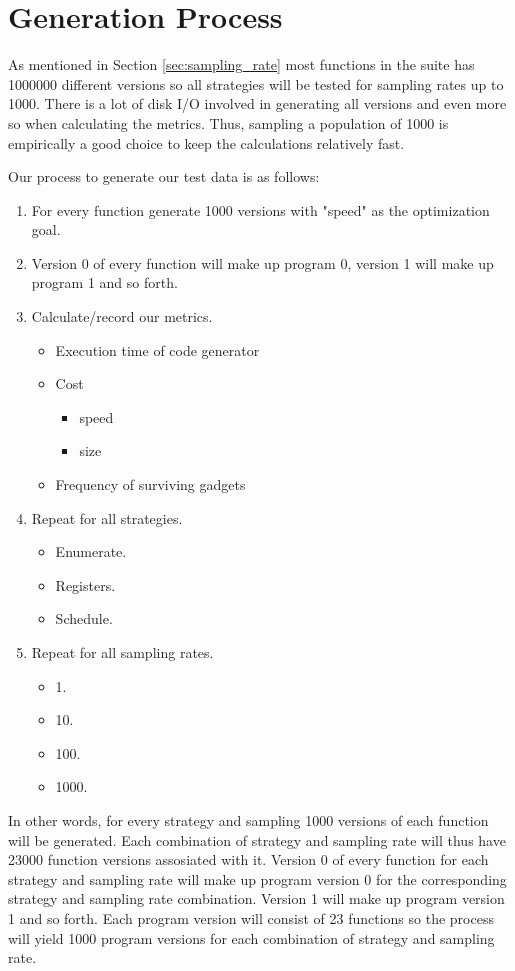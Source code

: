 \section{Generation Process}

As mentioned in Section \ref{sec:sampling_rate} most functions in the suite has 1000000
different versions so all strategies will be tested for sampling rates up to 1000. There
is a lot of disk I/O involved in generating all versions and even more so when calculating
the metrics. Thus, sampling a population of 1000 is empirically a good choice to keep the
calculations relatively fast.

Our process to generate our test data is as follows:

\begin{enumerate}
	\item For every function generate 1000 versions with "speed" as the optimization goal.
	\item Version 0 of every function will make up program 0, version 1 will make up program
		1 and so forth.
	\item Calculate/record our metrics.
		\begin{itemize}
			\item Execution time of code generator
			\item Cost
				\begin{itemize}
					\item speed
					\item size
				\end{itemize}
			\item Frequency of surviving gadgets
		\end{itemize}
	\item Repeat for all strategies.
		\begin{itemize}
			\item Enumerate.
			\item Registers.
			\item Schedule.
		\end{itemize}
	\item Repeat for all sampling rates.
		\begin{itemize}
			\item 1.
			\item 10.
			\item 100.
			\item 1000.
		\end{itemize}
\end{enumerate}

In other words, for every strategy and sampling 1000 versions of each function will be
generated. Each combination of strategy and sampling rate will thus have 23000 function
versions assosiated with it. Version 0 of every function for each strategy and sampling
rate will make up program version 0 for the corresponding strategy and sampling rate
combination. Version 1 will make up program version 1 and so forth. Each program version
will consist of 23 functions so the process will yield 1000 program versions for each
combination of strategy and sampling rate.

